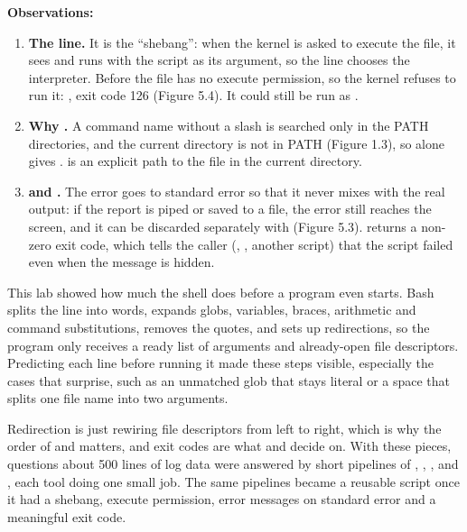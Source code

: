 \documentclass[11pt,a4paper]{article}
\begin{document}
\textbf{Observations:}
\begin{enumerate}
  \item \textbf{The  line.} It is the ``shebang'': when the kernel is asked
  to execute the file, it sees \code{\#!} and runs  with the script as its
  argument, so the line chooses the interpreter. Before  the file has no execute
  permission, so the kernel refuses to run it: , exit code 126
  (Figure 5.4). It could still be run as .
  \item \textbf{Why .} A command name without a slash is searched only in the
  PATH directories, and the current directory is not in PATH (Figure 1.3), so
   alone gives .  is an explicit path to the
  file in the current directory.
  \item \textbf{ and .} The error goes to standard error so that it
  never mixes with the real output: if the report is piped or saved to a file, the error still
  reaches the screen, and it can be discarded separately with 
  (Figure 5.3).  returns a non-zero exit code, which tells the caller
  (\code{\&\&}, \code{||}, another script) that the script failed even when the message is
  hidden.
\end{enumerate}


This lab showed how much the shell does before a program even starts. Bash splits the line into
words, expands globs, variables, braces, arithmetic and command substitutions, removes the
quotes, and sets up redirections, so the program only receives a ready list of arguments and
already-open file descriptors. Predicting each line before running it made these steps
visible, especially the cases that surprise, such as an unmatched glob that stays literal or a
space that splits one file name into two arguments.

Redirection is just rewiring file descriptors from left to right, which is why the order of
\code{>} and  matters, and exit codes are what \code{\&\&} and \code{||} decide on.
With these pieces, questions about 500 lines of log data were answered by short pipelines of
, , ,  and , each tool doing one small
job. The same pipelines became a reusable script once it had a shebang, execute permission,
error messages on standard error and a meaningful exit code.
\end{document}
